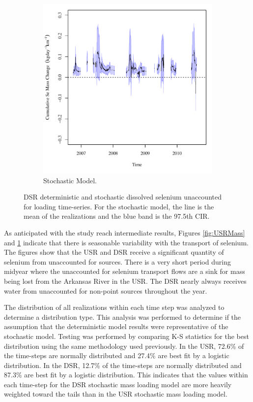 \begin{landscape}
\begin{figure}
\begin{subfigure}{0.7\textwidth}
			\includegraphics[width=\tableCustomSize]{"Figures/Results_DSR/Stochastic/Balance Mass"}
			\caption{Stochastic Model.}
		\end{subfigure}
		\caption[DSR deterministic and stochastic dissolved selenium unaccounted for loading time-series.]{DSR deterministic and stochastic dissolved selenium unaccounted for loading time-series.  For the stochastic model, the line is the mean of the realizations and the blue band is the 97.5th CIR.}
		\label{fig:DSRMass}
	\end{figure}
\end{landscape}

As anticipated with the study reach intermediate results, Figures \ref{fig:USRMass} and \ref{fig:DSRMass} indicate that there is seasonable variability with the transport of selenium.  The figures show that the USR and DSR receive a significant quantity of selenium from unaccounted for sources.  There is a very short period during midyear where the unaccounted for selenium transport flows are a sink for mass being lost from the Arkansas River in the USR.  The DSR nearly always receives water from unaccounted for non-point sources throughout the year.

The distribution of all realizations within each time step was analyzed to determine a distribution type.  This analysis was performed to determine if the assumption that the deterministic model results were representative of the stochastic model.   Testing was performed by comparing K-S statistics for the best distribution using the same methodology used previously.  In the USR, 72.6\% of the time-steps are normally distributed and 27.4\% are best fit by a logistic distribution.  In the DSR, 12.7\% of the time-steps are normally distributed and 87.3\% are best fit by a logistic distribution.  This indicates that the values within each time-step for the DSR stochastic mass loading model are more heavily weighted toward the tails than in the USR stochastic mass loading model.

